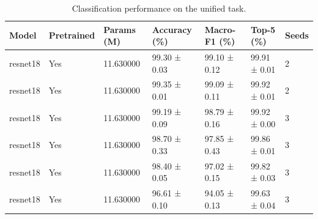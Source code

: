 \begin{table}[t]
\centering
\caption{Classification performance on the unified task.}
\label{tab:main_benchmark}
\begin{tabular}{lllllll}
\toprule
Model & Pretrained & Params (M) & Accuracy (\%) & Macro-F1 (\%) & Top-5 (\%) & Seeds \\
\midrule
resnet18 & Yes & 11.630000 & 99.30 ± 0.03 & 99.10 ± 0.12 & 99.91 ± 0.01 & 2 \\
resnet18 & Yes & 11.630000 & 99.35 ± 0.01 & 99.09 ± 0.11 & 99.92 ± 0.01 & 2 \\
resnet18 & Yes & 11.630000 & 99.19 ± 0.09 & 98.79 ± 0.16 & 99.92 ± 0.00 & 3 \\
resnet18 & Yes & 11.630000 & 98.70 ± 0.33 & 97.85 ± 0.43 & 99.86 ± 0.01 & 3 \\
resnet18 & Yes & 11.630000 & 98.40 ± 0.05 & 97.02 ± 0.15 & 99.82 ± 0.03 & 3 \\
resnet18 & Yes & 11.630000 & 96.61 ± 0.10 & 94.05 ± 0.13 & 99.63 ± 0.04 & 3 \\
\bottomrule
\end{tabular}
\end{table}
